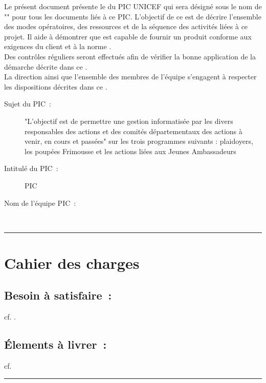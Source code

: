 		Le présent document présente le \PQ{} du PIC UNICEF qui sera désigné sous le nom de "\nomEquipe" pour tous les documents liés à ce PIC. L'objectif de ce \PQ{} est de décrire l'ensemble des modes opératoires, des ressources et de la séquence des activités liées à ce projet. Il aide à démontrer que \nomEquipe{} est capable de fournir un produit conforme aux exigences du client et à la norme \ISO . \\
		
		Des contrôles réguliers seront effectués afin de vérifier la bonne application de la démarche décrite dans ce \PQ .\\
		
		La direction ainsi que l'ensemble des membres de l'équipe \nomEquipe{} s'engagent à respecter les dispositions décrites dans ce \PQ .\\ 
		

		
	\begin{description}
		\item[Sujet du PIC~:] "L'objectif est de permettre une gestion informatisée par les divers responsables des actions et des comités départementaux des actions à venir, en cours et passées" sur les trois programmes suivants : plaidoyers, les poupées Frimousse et les actions liées aux Jeunes Ambassadeurs \\	
		\item[Intitulé du PIC~:] PIC \nomPIC \\	
		\item[Nom de l'équipe PIC~:] \nomEquipe \\
	\end{description}


\noindent\hfil\rule{\textwidth}{.4pt}\hfil


		
\section*{Cahier des charges}
		\subsection*{Besoin à satisfaire~:} 
			cf. \DSE . 		
		\subsection*{Élements à livrer~:}
			cf. \DSE
			
					


	\vspace{1cm}
	\noindent\hfil\rule{\textwidth}{.4pt}\hfil
	\vspace{1cm}	
	
